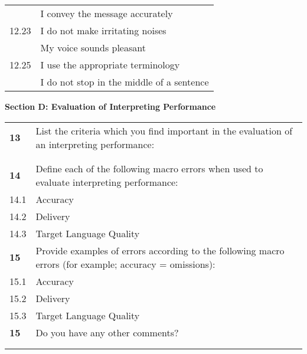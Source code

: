 \documentclass[output=paper]{langsci/langscibook}
\begin{document}
{\begin{center}
\begin{tabularx}{\textwidth}{Xp{}}
\rowcolor{lsLightGray!50}{\small 12.22} & \parbox[t]{.4\textwidth}{\small I convey the message accurately} \\
{\small 12.23} & \parbox[t]{.4\textwidth}{\small I do not make irritating noises} \\
 & \parbox[t]{.4\textwidth}{\small My voice sounds pleasant} \\
{\small 12.25} & \parbox[t]{.4\textwidth}{\small I use the appropriate terminology} \\
 & \parbox[t]{.4\textwidth}{\small I do not stop in the middle of a sentence} \\
\end{tabularx}
\end{center}

\textbf{Section D: Evaluation of Interpreting Performance}
\begin{center}
\begin{tabularx}{\textwidth}{Xp{}}
\rowcolor{lsLightGray} \textbf{13} & List the criteria which you find important in the evaluation of an interpreting performance: \\
  & \\
  & \\
\rowcolor{lsLightGray} \textbf{14} & Define each of the following macro errors when used to evaluate interpreting performance: \\
14.1 & Accuracy \\
14.2 & Delivery \\
14.3 & Target Language Quality \\
\rowcolor{lsLightGray} \textbf{15} & Provide examples of errors according to the following macro errors (for example; accuracy = omissions):\\
15.1 & Accuracy \\
15.2 & Delivery \\
15.3 & Target Language Quality \\
\rowcolor{lsLightGray} \textbf{15} & Do you have any other comments?\\
& \\
& \\
\end{tabularx}   
\end{center}
}

\newpage
\end{document}
